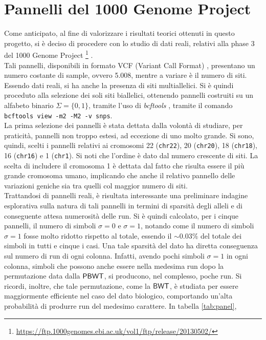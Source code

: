 \section{Pannelli del 1000 Genome Project}
Come anticipato, al fine di valorizzare i risultati teorici ottenuti in
questo progetto, si 
è deciso di procedere con lo studio di dati reali, relativi alla phase
  3 del 1000 Genome Project
\footnote{\url{https://ftp.1000genomes.ebi.ac.uk/vol1/ftp/release/20130502/}}
\cite{1kgp}.\\ 
Tali pannelli, disponibili in formato VCF (Variant Call Format) \cite{vcf},
presentano un numero 
costante di sample, ovvero 5.008, mentre a variare è il numero di siti. Essendo
dati reali, si ha anche la presenza di siti multiallelici. Si è quindi proceduto
alla selezione dei soli siti biallelici, ottenendo pannelli costruiti su
un alfabeto binario $\Sigma=\{0,1\}$, tramite l'uso di \textit{bcftools}
\cite{bcftools}, tramite il comando \texttt{bcftools view -m2 -M2
  -v snps}.\\
La prima selezione dei pannelli è stata dettata dalla volontà di studiare, per
praticità, pannelli non troppo estesi, ad eccezione di uno molto grande. Si
sono, 
quindi, scelti i pannelli relativi ai cromosomi 22 (\texttt{chr22}), 20
(\texttt{chr20}), 18 (\texttt{chr18}), 16 (\texttt{chr16}) e 1 (\texttt{chr1}).
Si noti che  
l'ordine è dato dal numero crescente di siti. La scelta di includere il
cromosoma 1 è dettata dal fatto che risulta essere il più grande cromosoma
umano, implicando che anche il relativo pannello delle variazioni geniche
sia tra quelli col maggior numero di siti.\\
Trattandosi di pannelli reali, è risultata interessante una preliminare
indagine esplorativa sulla natura di tali pannelli in termini di
sparsità degli alleli e di conseguente attesa numerosità delle run. Si è
quindi calcolato, per i cinque pannelli, il numero di simboli $\sigma=0$ e
$\sigma=1$, notando come il numero di simboli $\sigma=1$ fosse molto ridotto
rispetto al totale, essendo il $\sim 0.03\%$ del totale dei simboli in tutti e
cinque i casi. Una tale
sparsità del dato ha diretta conseguenza sul numero di run di ogni
colonna. Infatti, avendo 
pochi simboli $\sigma=1$ in ogni colonna, simboli che possono anche
essere nella medesima run dopo la permutazione data dalla
$\mbox{\rm {\sf PBWT}}$, si producono, nel complesso, poche run. Si ricordi, inoltre, che tale
permutazione, come la 
$\mbox{\rm {\sf BWT}}$, è studiata per essere 
maggiormente efficiente nel caso del dato biologico, comportando un'alta
probabilità di produrre run del medesimo carattere. In tabella \ref{tab:panel},
